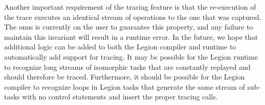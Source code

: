 Another important requirement of the tracing
feature is that the re-execution of the trace
executes an identical stream of operations
to the one that was captured. The onus is
currently on the user to guarantee this 
property, and any failure to maintain this
invariant will result in a runtime error. In the 
future, we hope that additional logic can be 
added to both the Legion compiler and runtime to
automatically add support for tracing.  It
may be possible for the Legion runtime to
recognize long streams of isomorphic tasks
that are constantly replayed and should
therefore be traced.  Furthermore, it should
be possible for the Legion compiler to 
recognize loops in Legion tasks that generate
the same stream of sub-tasks with no
control statements and insert the proper 
tracing calls.

